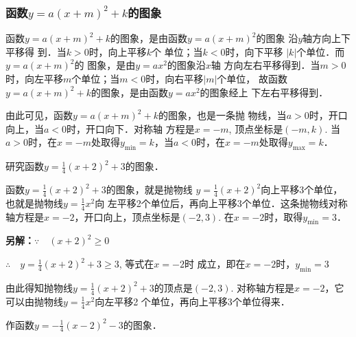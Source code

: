 \subsubsection{函数$y=a(x+m)^2+k$的图象}

函数$y=a(x+m)^2+k$的图象，是由函数$y=a(x+m)^2$的图象
沿$y$轴方向上下平移得
到．当$k>0$时，向上平移$k$个
单位；当$k<0$时，向下平移
$|k|$个单位．而$y=a(x+m)^2$的
图象，是由$y=ax^2$的图象沿$x$轴
方向左右平移得到．当$m>0$
时，向左平移$m$个单位；当$m<0$时，向右平移$|m|$个单位，
故函数$y=a(x+m)^2+k$的图象，是由函数$y=ax^2$的图象经上
下左右平移得到．

由此可见，函数$y=a(x+m)^2+k$的图象，也是一条抛
物线，当$a>0$时，开口向上，当$a<0$时，开口向下．对称轴
方程是$x=-m$, 顶点坐标是$(-m,k)$. 当$a>0$时，在$x=
-m$处取得$y_{\min}=k$，当$a<0$时，在$x=-m$处取得$y_{\max}=k$．

\begin{example}
    研究函数$y=\frac{1}{4}(x+2)^2+3$的图象．
\end{example}

\begin{solution}
函数$y=\frac{1}{4}(x+2)^2+3$的图象，就是抛物线
$y=\frac{1}{4}(x+2)^2$向上平移3个单位，也就是抛物线$y=\frac{1}{4}x^2$向
左平移2个单位后，再向上平移3个单位．这条抛物线对称
轴方程是$x=-2$，开口向上，顶点坐标是$(-2,3)$. 在$x=-2$时，取得$y_{\min}=3$．

\textbf{另解：}$\because\quad (x+2)^2\ge 0$

$\therefore\quad y=\frac{1}{4}(x+2)^2+3\ge 3$, 等式在$x=-2$时
成立，即在$x=-2$时，$y_{\min}=3$

由此得知抛物线$y=\frac{1}{4}(x+2)^2+3$的顶点是$(-2,3)$. 
对称轴方程是$x=-2$，它可以由抛物线$y=\frac{1}{4}x^2$向左平移2
个单位，再向上平移3个单位得来．
\end{solution}


\begin{example}
    作函数$y=-\frac{1}{4}(x-2)^2-3$的图象．
\end{example}

